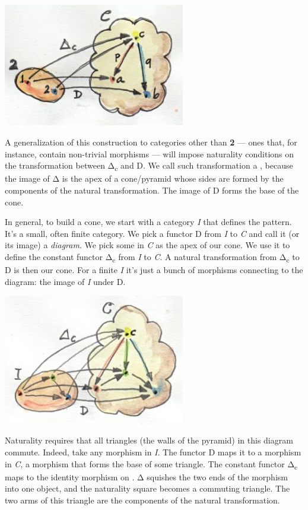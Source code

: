 \includegraphics[width=3.12500in]{images/productcone.jpg}

A generalization of this construction to categories other than
\textbf{2} --- ones that, for instance, contain non-trivial morphisms
--- will impose naturality conditions on the transformation between
Δ\textsubscript{c} and D. We call such transformation a ,
because the image of Δ is the apex of a cone/pyramid whose sides are
formed by the components of the natural transformation. The image of D
forms the base of the cone.

In general, to build a cone, we start with a category \emph{I} that
defines the pattern. It's a small, often finite category. We pick a
functor D from \emph{I} to \emph{C} and call it (or its image) a
\emph{diagram}. We pick some  in \emph{C} as the apex of our
cone. We use it to define the constant functor Δ\textsubscript{c} from
\emph{I} to \emph{C}. A natural transformation from Δ\textsubscript{c}
to D is then our cone. For a finite \emph{I} it's just a bunch of
morphisms connecting  to the diagram: the image of \emph{I}
under D.

\includegraphics[width=3.12500in]{images/cone.jpg}

Naturality requires that all triangles (the walls of the pyramid) in
this diagram commute. Indeed, take any morphism  in \emph{I}.
The functor D maps it to a morphism  in \emph{C}, a
morphism that forms the base of some triangle. The constant functor
Δ\textsubscript{c} maps  to the identity morphism on
. Δ squishes the two ends of the morphism into one object, and
the naturality square becomes a commuting triangle. The two arms of this
triangle are the components of the natural transformation.


